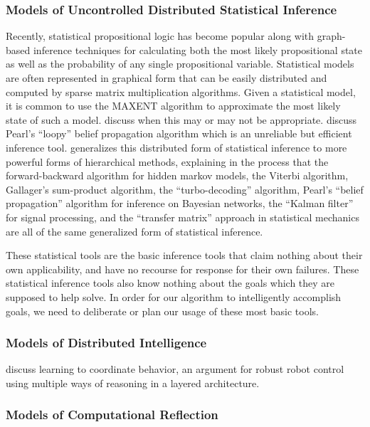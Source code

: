 \subsubsection{Models of Uncontrolled Distributed Statistical Inference}
Recently, statistical propositional logic has become popular along with graph-based inference techniques for calculating both the most likely propositional state as well as the probability of any single propositional variable.
Statistical models are often represented in graphical form that can be easily distributed and computed by sparse matrix multiplication algorithms.
Given a statistical model, it is common to use the MAXENT algorithm to approximate the most likely state of such a model.
\cite{jaynes:1982} discuss when this may or may not be appropriate.
\cite{murphy:1999} discuss Pearl's ``loopy'' belief propagation algorithm which is an unreliable but efficient inference tool.
\cite{yedidia:2005} generalizes this distributed form of statistical inference to more powerful forms of hierarchical methods, explaining in the process that the forward-backward algorithm for hidden markov models, the Viterbi algorithm, Gallager's sum-product algorithm, the ``turbo-decoding'' algorithm, Pearl's ``belief propagation'' algorithm for inference on Bayesian networks, the ``Kalman filter'' for signal processing, and the ``transfer matrix'' approach in statistical mechanics are all of the same generalized form of statistical inference.

These statistical tools are the basic inference tools that claim nothing about their own applicability, and have no recourse for response for their own failures.
These statistical inference tools also know nothing about the goals which they are supposed to help solve.
In order for our algorithm to intelligently accomplish goals, we need to deliberate or plan our usage of these most basic tools.

\subsubsection{Models of Distributed Intelligence}

\cite{maes:1990} discuss learning to coordinate behavior, an argument for robust robot control using multiple ways of reasoning in a layered architecture.

\subsubsection{Models of Computational Reflection}

